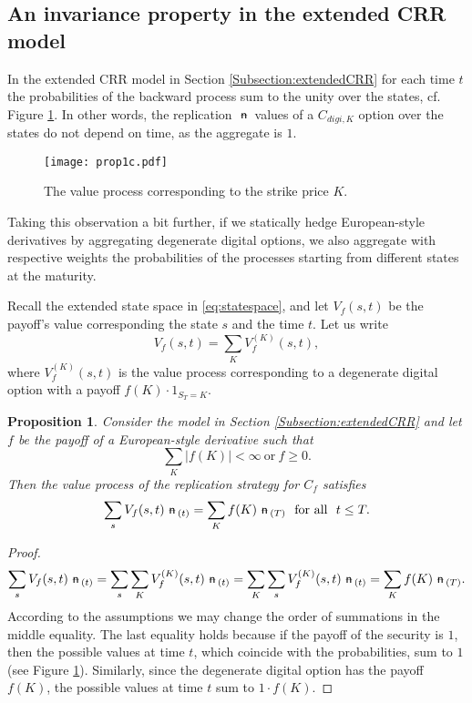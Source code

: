 \documentclass{amsart}
\newtheorem{proposition}[theorem]{Proposition}
\theoremstyle{definition}
\theoremstyle{remark}
\newcommand{\n}{\!\!\ \nn \!\!\ }
\def\nn{\mathrel{%
    \mathchoice{\n}{\n}{\scriptsize\n}{\tiny\n}%
}}
\def\n {{%
    \setbox0\hbox{ \textsf{n}\!\  }%
    \rlap{\hbox to \wd0{\hss \!\ --\hss}}\box0
}}
\numberwithin{equation}{section}
\newcommand{\1}{\boldsymbol{1}}
\begin{document}
\subsection{An invariance property in the extended CRR model}

In the extended CRR model in Section \ref{Subsection:extendedCRR} for each time $t$ 
the probabilities of the backward process sum to the unity over the states, cf. Figure \ref{figure:prop1}. In other words, the replication $\n$ values 
of a $C_{digi ,K}$ option over the states do not depend on time, as the aggregate is $1$. 

\begin{figure}[h!]
\begin{center}
\texttt{[image: prop1c.pdf]}
\caption{The value process corresponding to the strike price $K$.}
\label{figure:prop1}
\end{center}
\end{figure}


Taking this observation a bit further, if we statically hedge European-style derivatives by aggregating degenerate digital options, we also aggregate with respective weights the probabilities of the processes starting from different states at the maturity.

Recall the extended state space in \eqref{eq:statespace}, and let $V_f(s,t)$ be the payoff's value corresponding the state $s$ and the time $t$. Let us write 
\[
V_f(s,t)=\sum_K V_f^{(K)}(s,t),
\]
where $V_f^{(K)}(s,t)$ is the value process corresponding to a degenerate digital option with a payoff $f(K)\cdot 1_{S_T=K}$.

\begin{proposition}\label{prop: aggregate}
Consider the model in Section \ref{Subsection:extendedCRR} and let $f$ be the payoff of a European-style derivative such that 
\[
\sum_K |f(K)|<\infty\ \text{or}\ f\geq 0 .
\]
Then the value process of the replication strategy for $C_f$ satisfies
\[
\sum_{s} V_f (s,t) \n_{(t)} =\sum_K f(K) \n_{(T)}\ \ \text{for\ all}\ \ t\leq T .
\]
\end{proposition}

\begin{proof}
\[
\sum_{s} V_f (s,t) \n_{(t)} =\sum_s\sum_K V_f^{(K)}(s,t) \n_{(t)} = \sum_K \sum_s V_f^{(K)}(s,t) \n_{(t)} 
=\sum_K f(K) \n_{(T)}.
\]
According to the assumptions we may change the order of summations in the middle equality. The last equality holds because if the payoff of the security is $1$, then the possible values at time $t$, which coincide with the probabilities, sum to $1$ (see Figure \ref{figure:prop1}). Similarly, since the degenerate digital option has the payoff $f(K)$, the possible values at time $t$ sum to $1\cdot f(K)$.
\end{proof}
\end{document}
